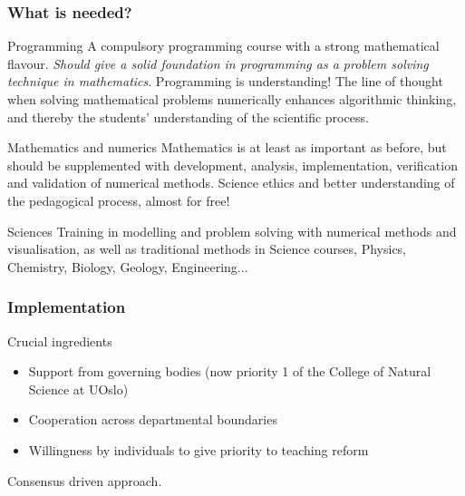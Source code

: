 \documentclass{beamer}
\begin{document}
\begin{frame}
\frametitle{What is needed?}

\begin{block}{Programming }
A compulsory programming course with a strong mathematical flavour. \emph{Should give a solid foundation in programming as a problem solving technique in mathematics}. Programming is understanding! The line of thought when solving mathematical problems numerically enhances algorithmic thinking,  and thereby the students' understanding of the scientific process.
\end{block}

\begin{block}{Mathematics and numerics }
Mathematics is at least as important as before, but should be supplemented with development, analysis, implementation, verification and validation of numerical methods. Science ethics and better understanding of the pedagogical process, almost for free!
\end{block}

\begin{block}{Sciences }
Training in modelling and problem solving with numerical methods and visualisation, as well as traditional methods in Science courses, Physics, Chemistry, Biology, Geology, Engineering...
\end{block}
\end{frame}

\begin{frame}
\frametitle{Implementation}

\begin{block}{Crucial ingredients }

\begin{itemize}
\item Support from governing bodies (now priority 1 of the College of Natural Science at UOslo)

\item Cooperation across departmental boundaries

\item Willingness by individuals to give priority to teaching reform
\end{itemize}

\noindent
Consensus driven approach.
\end{block}
\end{frame}
\end{document}
